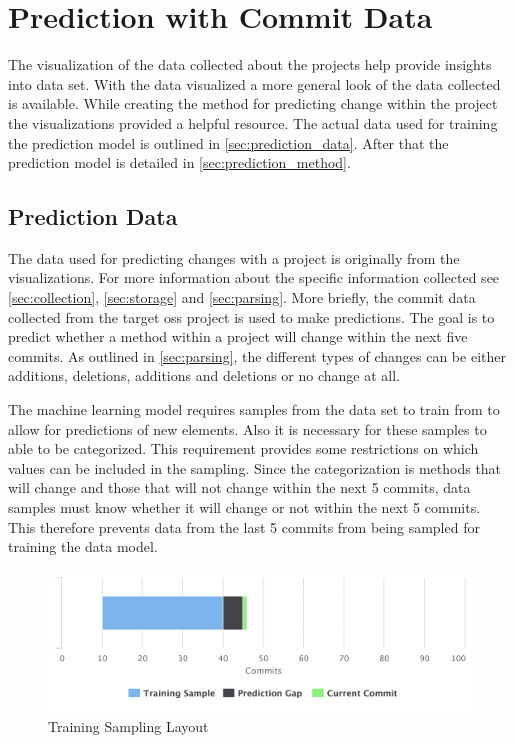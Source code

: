 \chapter{Prediction with Commit Data}
\label{chap:prediction}


The visualization of the data collected about the projects help provide insights into data set. With the data visualized a more general look of the data collected is available. While creating the method for predicting change within the project the visualizations provided a helpful resource. The actual data used for training the prediction model is outlined in \autoref{sec:prediction_data}. After that the prediction model is detailed in \autoref{sec:prediction_method}. %

\section{Prediction Data}
\label{sec:prediction_data}

The data used for predicting changes with a project is originally from the visualizations. For more information about the specific information collected see  \autoref{sec:collection}, \autoref{sec:storage} and \autoref{sec:parsing}. More briefly, the commit data collected from the target \gls{oss} project is used to make predictions. The goal is to predict whether a method within a project will change within the next five commits. As outlined in \autoref{sec:parsing}, the different types of changes can be either additions, deletions, additions and deletions or no change at all.

The machine learning model requires samples from the data set to train from to allow for predictions of new elements. Also it is necessary for these samples to able to be categorized. This requirement provides some restrictions on which values can be included in the sampling. Since the categorization is methods that will change and those that will not change within the next 5 commits, data samples must know whether it will change or not within the next 5 commits. This therefore prevents data from the last 5 commits from being sampled for training the data model.

\begin{figure}[!ht]
    \centering
        \includegraphics[width=1.0\textwidth]{images/training_sampling}
    \caption{Training Sampling Layout}
    \label{fig:training_data_range}
\end{figure}

